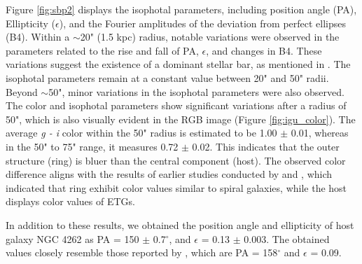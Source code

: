 \documentclass[fleqn,usenatbib]{mnras}
\begin{document}
Figure \ref{fig:sbp2} displays the isophotal parameters, including position angle (PA), Ellipticity ($\epsilon$), and the Fourier amplitudes of the deviation from perfect ellipses (B4). Within a $\sim $20" (1.5 kpc) radius, notable variations were observed in the parameters related to the rise and fall of PA, $\epsilon$, and changes in B4. These variations suggest the existence of a dominant stellar bar, as mentioned in \citet{Ferrarese2006}. The isophotal parameters remain at a constant value between 20" and 50" radii.  Beyond $\sim$50", minor variations in the isophotal parameters were also observed. The color and isophotal parameters show significant variations after a radius of 50", which is also visually evident in the RGB image (Figure \ref{fig:igu_color}). The average {\it g - i} color within the 50" radius is estimated to be 1.00 $\pm$ 0.01, whereas in the 50" to 75" range, it measures 0.72 $\pm$ 0.02. This indicates that the outer structure (ring) is bluer than the central component (host). The observed color difference aligns with the results of earlier studies conducted by \citet{2015ReshetnikovCombes2014} and \citet{2024akr}, which indicated that ring exhibit color values similar to spiral galaxies, while the host displays color values of ETGs.

In addition to these results, we obtained the position angle and ellipticity of host galaxy NGC 4262 as  PA = 150 $\pm$  0.7$^{\circ}$, and $\epsilon$ = 0.13 $\pm$ 0.003. The obtained values closely resemble those reported by \citet{2015salo}, which are PA = 158$^{\circ}$ and $\epsilon$ = 0.09. 


\begin{table}
\caption{Presents the results obtained from fitting the surface brightness profiles of NGC 4262 with Sérsic profiles in the {\it u, g, i}, and {\it z} filters.}
\label{tab:sbtab}
\end{table}
\end{document}
